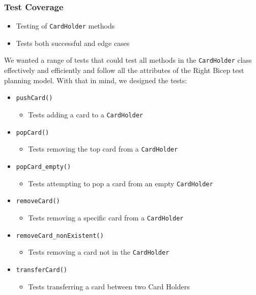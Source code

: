 \documentclass{article}
\begin{document}
\subsubsection{Test Coverage}
\begin{itemize}
    \item Testing of \texttt{CardHolder} methods
    \item Tests both successful and edge cases
\end{itemize}
We wanted a range of tests that could test all methods in the \texttt{CardHolder} class effectively and efficiently and follow all the attributes of the Right Bicep test planning model. With that in mind, we designed the tests:
\begin{itemize}
    \item \texttt{pushCard()}
          \begin{itemize}
              \item Tests adding a card to a \texttt{CardHolder}
          \end{itemize}
    \item \texttt{popCard()}
          \begin{itemize}
              \item Tests removing the top card from a \texttt{CardHolder}
          \end{itemize}
    \item \texttt{popCard\_empty()}
          \begin{itemize}
              \item Tests attempting to pop a card from an empty \texttt{CardHolder}
          \end{itemize}
    \item \texttt{removeCard()}
          \begin{itemize}
              \item Tests removing a specific card from a \texttt{CardHolder}
          \end{itemize}
    \item \texttt{removeCard\_nonExistent()}
          \begin{itemize}
              \item Tests removing a card not in the \texttt{CardHolder}
          \end{itemize}
    \item \texttt{transferCard()}
          \begin{itemize}
              \item Tests transferring a card between two Card Holders

\end{itemize}
\end{itemize}
\end{document}
